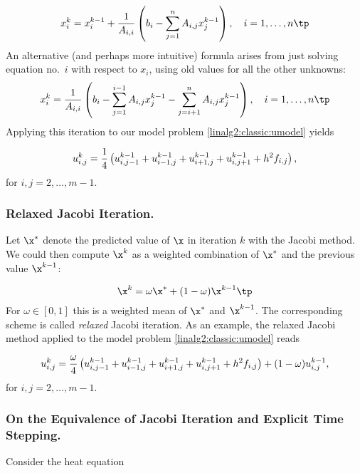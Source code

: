 \begin{equation}
x_i^{k} = x_i^{k-1} + {1\over A_{i,i}}\left(
 b_i - \sum_{j=1}^n A_{i,j}x_j^{k-1}\right),\quad i=1,\ldots,n
\tp
\end{equation}
An alternative (and perhaps more intuitive) formula arises from just solving
equation no.~$i$ with respect to $x_i$, using old values for all the
other unknowns:
\[ x_i^k = {1\over A_{i,i}} \left(b_i - \sum_{j=1}^{i-1}A_{i,j}x_j^{k-1}
- \sum_{j=i+1}^{n}A_{i,j}x_j^{k-1}\right),\quad i=1,\ldots,n\tp \]
Applying this iteration to our model problem \eqref{linalg2:classic:umodel}
yields

\begin{equation}
u^{k}_{i,j} = {1\over4}\left(
u^{k-1}_{i,j-1} + u^{k-1}_{i-1,j} + u^{k-1}_{i+1,j} + u^{k-1}_{i,j+1}
+ h^2f_{i,j}\right)
\label{linalg2:classic:Jacobi2},
\end{equation}
for $i,j=2,\ldots,m-1$.

\subsubsection{Relaxed Jacobi Iteration.}
\label{ch:linalg2:relaxed:Jacobi}
Let $\x^*$ denote the
predicted value of $\x$ in iteration $k$ with the Jacobi method.
We could then compute $\x^{k}$ as a weighted combination of $\x^*$
and the previous value $\x^{k-1}$:

\begin{equation}
\x^{k} = \omega\x^* + (1-\omega )\x^{k-1}
\label{linalg:relax}\tp
\end{equation}
For $\omega\in [0,1]$ this is a weighted mean of $\x^*$ and $\x^{k-1}$.
The corresponding scheme is called \emph{relaxed} Jacobi iteration.
As an example, the relaxed Jacobi method applied to the model
problem \eqref{linalg2:classic:umodel} reads

\begin{equation}
u^{k}_{i,j} = {\omega\over4}\left(
u^{k-1}_{i,j-1} + u^{k-1}_{i-1,j} + u^{k-1}_{i+1,j} + u^{k-1}_{i,j+1}
+ h^2f_{i,j}\right) + (1-\omega )u_{i,j}^{k-1}
\label{linalg2:classic:Jacobi3},
\end{equation}
for $i,j=2,\ldots,m-1$.

\subsubsection{On
the Equivalence of Jacobi Iteration and Explicit Time Stepping.}
Consider the heat equation

